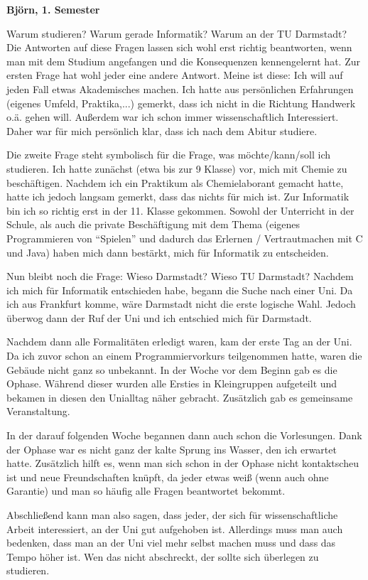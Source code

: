 {    \textbf{Björn, 1. Semester}

    Warum studieren? Warum gerade Informatik? Warum an der TU Darmstadt? Die Antworten auf diese Fragen lassen sich wohl erst richtig beantworten, wenn man mit dem Studium angefangen und die Konsequenzen kennengelernt hat. Zur ersten Frage hat wohl jeder eine andere Antwort. Meine ist diese: Ich will auf jeden Fall etwas Akademisches machen. Ich hatte aus persönlichen Erfahrungen (eigenes Umfeld, Praktika,...) gemerkt, dass ich nicht in die Richtung Handwerk o.ä. gehen will. Außerdem war ich schon immer wissenschaftlich Interessiert. Daher war für mich persönlich klar, dass ich nach dem Abitur studiere.

    Die zweite Frage steht symbolisch für die Frage, was möchte/kann/soll ich studieren. Ich hatte zunächst (etwa bis zur 9 Klasse) vor, mich mit Chemie zu beschäftigen. Nachdem ich ein Praktikum als Chemielaborant gemacht hatte, hatte ich jedoch langsam gemerkt, dass das nichts für mich ist. Zur Informatik bin ich so richtig erst in der 11. Klasse gekommen. Sowohl der Unterricht in der Schule, als auch die private Beschäftigung mit dem Thema (eigenes Programmieren von "`Spielen"' und dadurch das Erlernen / Vertrautmachen mit C und Java) haben mich dann bestärkt, mich für Informatik zu entscheiden.

    Nun bleibt noch die Frage: Wieso Darmstadt? Wieso TU Darmstadt? Nachdem ich mich für Informatik entschieden habe, begann die Suche nach einer Uni. Da ich aus Frankfurt komme, wäre Darmstadt nicht die erste logische Wahl. Jedoch überwog dann der Ruf der Uni und ich entschied mich für Darmstadt.

    Nachdem dann alle Formalitäten erledigt waren, kam der erste Tag an der Uni. Da ich zuvor schon an einem Programmiervorkurs teilgenommen hatte, waren die Gebäude nicht ganz so unbekannt. In der Woche vor dem Beginn gab es die Ophase. Während dieser wurden alle Ersties in Kleingruppen aufgeteilt und bekamen in diesen den Unialltag näher gebracht. Zusätzlich gab es gemeinsame Veranstaltung.

    In der darauf folgenden Woche begannen dann auch schon die Vorlesungen. Dank der Ophase war es nicht ganz der kalte Sprung ins Wasser, den ich erwartet hatte. Zusätzlich hilft es, wenn man sich schon in der Ophase nicht kontaktscheu ist und neue Freundschaften knüpft, da jeder etwas weiß (wenn auch ohne Garantie) und man so häufig alle Fragen beantwortet bekommt.

    Abschließend kann man also sagen, dass jeder, der sich für wissenschaftliche Arbeit interessiert, an der Uni gut aufgehoben ist. Allerdings muss man auch bedenken, dass man an der Uni viel mehr selbst machen muss und dass das Tempo höher ist. Wen das nicht abschreckt, der sollte sich überlegen zu studieren.\\

}
